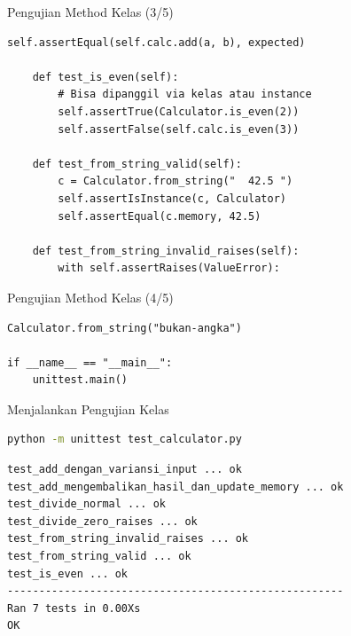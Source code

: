 \documentclass[aspectratio=169, table]{beamer}
\begin{document}
\begin{frame}[fragile]{Pengujian Method Kelas (3/5)}
\vspace*{20pt}
\begin{lstlisting}[style=PythonStyle]
                self.assertEqual(self.calc.add(a, b), expected)

    def test_is_even(self):
        # Bisa dipanggil via kelas atau instance
        self.assertTrue(Calculator.is_even(2))
        self.assertFalse(self.calc.is_even(3))

    def test_from_string_valid(self):
        c = Calculator.from_string("  42.5 ")
        self.assertIsInstance(c, Calculator)
        self.assertEqual(c.memory, 42.5)

    def test_from_string_invalid_raises(self):
        with self.assertRaises(ValueError):
\end{lstlisting}
\end{frame}

\begin{frame}[fragile]{Pengujian Method Kelas (4/5)}
\vspace*{20pt}
\begin{lstlisting}[style=PythonStyle]
            Calculator.from_string("bukan-angka")

if __name__ == "__main__":
    unittest.main()
\end{lstlisting}
\end{frame}

\begin{frame}[fragile]{Menjalankan Pengujian Kelas}
\vspace*{20pt}
\begin{lstlisting}[language=bash]
python -m unittest test_calculator.py
\end{lstlisting}
\begin{lstlisting}[language=bash, caption={Keluaran yang diharapkan (ilustrasi)}]
test_add_dengan_variansi_input ... ok
test_add_mengembalikan_hasil_dan_update_memory ... ok
test_divide_normal ... ok
test_divide_zero_raises ... ok
test_from_string_invalid_raises ... ok
test_from_string_valid ... ok
test_is_even ... ok
-----------------------------------------------------
Ran 7 tests in 0.00Xs
OK
\end{lstlisting}
\end{frame}
\end{document}
